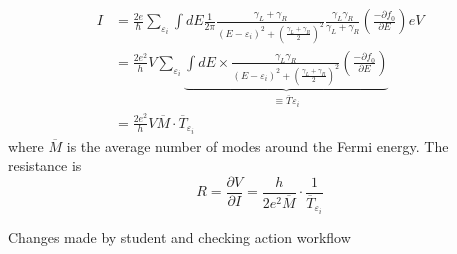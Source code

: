 \begin{align}
    I& = \frac{2e}{\hbar}\sum_{\varepsilon_{i}}{\int dE \frac{1}{2\pi}\frac{\gamma_{L}+\gamma_{R}}{\left(E-\varepsilon_{i}\right)^{2}+\left(\frac{\gamma_{L}+\gamma_{R}}{2}\right)^{2}} \frac{\gamma_{L}\gamma_{R}}{\gamma_{L}+\gamma_{R}} \left(\frac{-\partial f_{0}}{\partial E}\right)eV}\nonumber\\
    &= \frac{2e^2}{h}V\sum_{\varepsilon_{i}}{\underbrace{\int dE\times \frac{\gamma_{L}\gamma_{R}}{\left(E-\varepsilon_{i}\right)^{2}+\left(\frac{\gamma_{L}+\gamma_{R}}{2}\right)^{2}} \left(\frac{-\partial f_{0}}{\partial E}\right)}_{\equiv \overline{T}_{}\varepsilon_{i}}}\nonumber\\
    &= \frac{2e^{2}}{h}V\overline{M}\cdot\overline{T}_{\varepsilon_{i}}
\end{align} where $\overline{M}$ is the average number of modes around the Fermi energy. The resistance is \begin{equation}
    R = \frac{\partial V}{\partial I} = \frac{h}{2e^{2}\overline{M}}\cdot\frac{1}{\overline{T}_{\varepsilon_{i}}}
\end{equation} 

Changes made by student and checking action workflow

